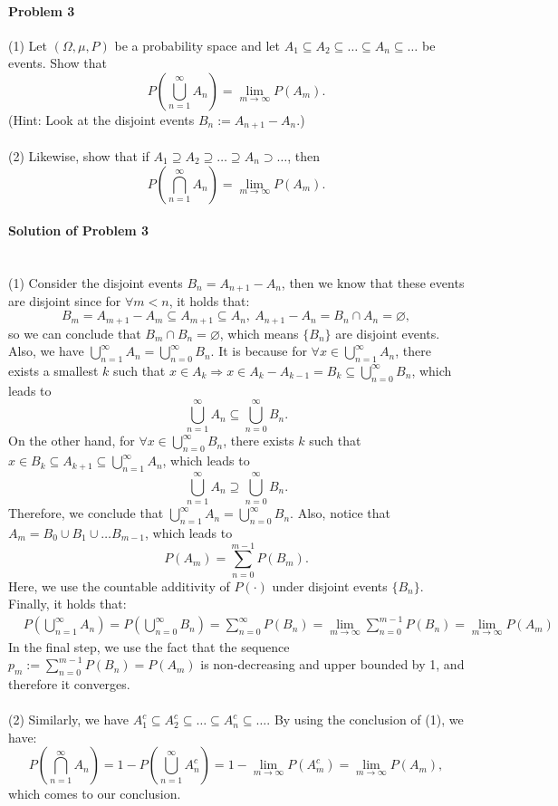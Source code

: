 \documentclass{article}
\begin{document}
\paragraph{Problem 3} (1) Let $(\Omega, \mu, P)$ be a probability space and let $A_1\subseteq A_2\subseteq\ldots\subseteq A_n\subseteq\ldots$ be events. Show that 
\[P\left(\bigcup_{n=1}^{\infty}A_n\right)=\lim_{m\rightarrow \infty} P(A_m).\]
(Hint: Look at the disjoint events $B_n :=A_{n+1}-A_n$.)\\
~\\
(2) Likewise, show that if $A_1\supseteq A_2 \supseteq\ldots\supseteq A_n\supset\ldots$, then
\[P\left(\bigcap_{n=1}^{\infty}A_n\right)=\lim_{m\rightarrow\infty} P(A_m).\]

\paragraph{Solution of Problem 3}~\\
(1) Consider the disjoint events $B_n=A_{n+1}-A_n$, then we know that these events are disjoint since for $\forall m<n$, it holds that:
\[B_m=A_{m+1}-A_m\subseteq A_{m+1}\subseteq A_n, ~A_{n+1}-A_n =B_n\cap A_n = \varnothing,\]
so we can conclude that $B_m\cap B_n=\varnothing$, which means $\{B_n\}$ are disjoint events. Also, we have $\bigcup_{n=1}^{\infty}A_n=\bigcup_{n=0}^{\infty}B_n$. It is because for $\forall x\in \bigcup_{n=1}^{\infty}A_n$, there exists a smallest $k$ such that $x\in A_k\Rightarrow x\in A_k-A_{k-1}=B_k\subseteq\bigcup_{n=0}^{\infty}B_n$, which leads to
\[\bigcup_{n=1}^{\infty}A_n\subseteq\bigcup_{n=0}^{\infty}B_n.\]
On the other hand, for $\forall x\in \bigcup_{n=0}^{\infty}B_n$, there exists $k$ such that $x\in B_k\subseteq A_{k+1}\subseteq\bigcup_{n=1}^{\infty}A_n$, which leads to
\[\bigcup_{n=1}^{\infty}A_n\supseteq\bigcup_{n=0}^{\infty}B_n.\]
Therefore, we conclude that $\bigcup_{n=1}^{\infty}A_n=\bigcup_{n=0}^{\infty}B_n$. Also, notice that $A_m=B_0\cup B_1\cup\ldots B_{m-1}$, which leads to
\[P(A_m)=\sum_{n=0}^{m-1}P(B_m).\]
Here, we use the countable additivity of $P(\cdot)$ under disjoint events $\{B_n\}$. Finally, it holds that:
\begin{equation*}
\begin{aligned}
&P\left(\bigcup_{n=1}^{\infty}A_n\right) = P\left(\bigcup_{n=0}^{\infty}B_n\right) = \sum_{n=0}^{\infty}P(B_n) =\lim_{m\rightarrow\infty}\sum_{n=0}^{m-1}P(B_n) = \lim_{m\rightarrow\infty} P(A_m)
\end{aligned}    
\end{equation*}
In the final step, we use the fact that the sequence $p_m := \sum_{n=0}^{m-1}P(B_n)=P(A_m)$ is non-decreasing and upper bounded by 1, and therefore it converges. \\
~\\
(2) Similarly, we have $A_1^c\subseteq A_2^c\subseteq\ldots\subseteq A_n^c\subseteq\ldots$. By using the conclusion of (1), we have:
\[P\left(\bigcap_{n=1}^{\infty}A_n\right)=1-P\left(\bigcup_{n=1}^{\infty}A_n^c\right)=1-\lim_{m\rightarrow\infty}P(A_m^c)=\lim_{m\rightarrow\infty}P(A_m),\]
which comes to our conclusion.
\end{document}
